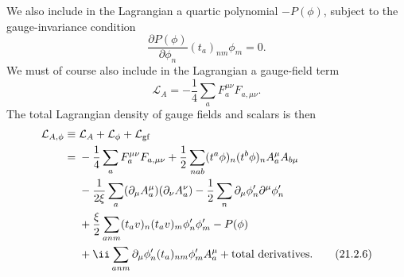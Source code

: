We also include in the Lagrangian a quartic polynomial $-P(\phi)$, subject
to the gauge-invariance condition
\begin{equation}
 \frac{\partial P(\phi)}{\partial\phi_n}
 (t_a)_{nm}\phi_m=0.
 \tag{21.2.4}\label{eq:21.2.4}
\end{equation}
We must of course also include in the Lagrangian a gauge-field term
\begin{equation}
 \mathcal L_A=-\frac14\sum_a
 F_a^{\mu\nu}F_{a,\mu\nu}.
 \tag{21.2.5}\label{eq:21.2.5}
\end{equation}
The total Lagrangian density of gauge fields and scalars is then
\begin{align}
 \mathcal L_{A,\phi}
 \equiv{}&\mathcal L_A+\mathcal L_\phi+\mathcal L_{\rm gf}
 \notag\\
 ={}&-\frac14\sum_a F_a^{\mu\nu}F_{a,\mu\nu}
 +\frac12\sum_{nab}
 (t^a\phi)_n(t^b\phi)_n
 A_a^\mu A_{b\mu}
 \notag\\
 &-\frac1{2\xi}\sum_a
 (\partial_\mu A_a^\mu)(\partial_\nu A_a^\nu)
 -\frac12\sum_n\partial_\mu\phi'_n\partial^\mu\phi'_n
 \notag\\
 &+\frac{\xi}{2}\sum_{a nm}
 (t_a v)_n(t_a v)_m\phi'_n\phi'_m
 -P(\phi)
 \notag\\
 &+\ii\sum_{a nm}
 \partial_\mu\phi'_n(t_a)_{nm}\phi'_mA_a^\mu
 +\text{total derivatives}.
 \tag{21.2.6}\label{eq:21.2.6}
\end{align}

